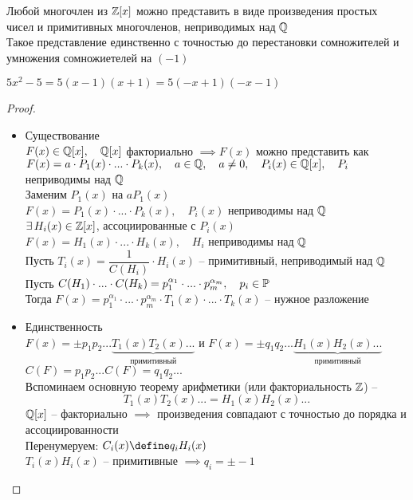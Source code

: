 \begin{theorem}
    Любой многочлен из $\mathbb{Z}[x]$ можно представить в виде произведения простых чисел и примитивных многочленов, неприводимых над $\mathbb{Q}$ \\
    Такое представление единственно с точностью до перестановки сомножителей и умножения сомножиетелей на $(-1)$
\end{theorem}

\begin{eg}
	$5x^2 - 5 = 5(x - 1)(x + 1) = 5(-x + 1)(-x - 1)$
\end{eg}

\begin{proof}
    \hfill
    \begin{itemize}
    	\item Существование \\
        $F(x) \in \mathbb{Q}[x], \quad \mathbb{Q}[x]$ факториально $\implies F(x)$ можно представить как $F(x) = a \cdot P_1(x) \cdot ... \cdot P_k(x), \quad a \in \mathbb{Q}, \quad a \ne 0, \quad P_i(x) \in \mathbb{Q}[x], \quad P_i$ неприводимы над $\mathbb{Q}$ \\
        Заменим $P_1(x)$ на $aP_1(x)$ \\
        $F(x) = P_1(x) \cdot ... \cdot P_k(x), \quad P_i(x)$ неприводимы над $\mathbb{Q}$ \\
        $ \exists\, H_i(x) \in \mathbb{Z}[x]$, ассоциированные с $P_i(x)$ \\
        $F(x) = H_1(x) \cdot ... \cdot H_k(x), \quad H_i$ неприводимы над $\mathbb{Q}$ \\
        Пусть $T_i(x) = \dfrac1{C(H_i)} \cdot H_i(x)$ -- примитивный, неприводимый над $\mathbb{Q}$ \\
        Пусть $C(H_1) \cdot ... \cdot C(H_k) = p_1^{\alpha_1} \cdot ... \cdot p_m^{\alpha_m}, \quad p_i \in \mathbb{P}$ \\
        Тогда $F(x) = p_1^{\alpha_1} \cdot ... \cdot p_m^{\alpha_m} \cdot T_1(x) \cdot ... \cdot T_k(x)$ -- нужное разложение
        \item Единственность \\
        $F(x) = \pm p_1p_2...\underbrace{T_1(x)T_2(x)...}_{\text{примитивный}}$ и $F(x) = \pm q_1q_2...\underbrace{H_1(x)H_2(x)...}_{\text{примитивный}}$ \\
        $C(F) = p_1p_2...C(F) = q_1q_2...$ \\
        Вспоминаем основную теорему арифметики (или факториальность $\mathbb{Z}$) -- \contra
        $$ T_1(x) T_2(x) ... = H_1(x) H_2(x) ... $$
        $\mathbb{Q}[x]$ -- факториально $\implies$ произведения совпадают с точностью до порядка и ассоциированности \\
        Перенумеруем: $C_i(x) \define q_i H_i(x)$ \\
        $T_i(x)H_i(x)$ -- примитивные $\implies q_i = \pm -1$
    \end{itemize}
\end{proof}

